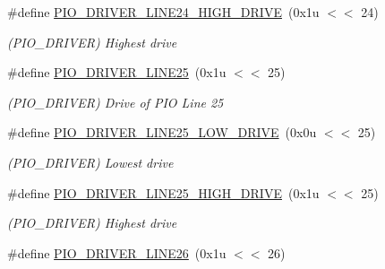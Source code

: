 \begin{DoxyCompactItemize}
\mbox{\label{group__SAMS70__PIO_gadde0770b938ec63b897a19f0f7a59d42}} 
\#define \mbox{\hyperlink{group__SAMS70__PIO_gadde0770b938ec63b897a19f0f7a59d42}{P\+I\+O\+\_\+\+D\+R\+I\+V\+E\+R\+\_\+\+L\+I\+N\+E24\+\_\+\+H\+I\+G\+H\+\_\+\+D\+R\+I\+VE}}~(0x1u $<$$<$ 24)
\begin{DoxyCompactList}\small\item\em (P\+I\+O\+\_\+\+D\+R\+I\+V\+ER) Highest drive \end{DoxyCompactList}\item 
\mbox{\label{group__SAMS70__PIO_ga7f8742c78a8a36d9daea4dd1878f0b41}} 
\#define \mbox{\hyperlink{group__SAMS70__PIO_ga7f8742c78a8a36d9daea4dd1878f0b41}{P\+I\+O\+\_\+\+D\+R\+I\+V\+E\+R\+\_\+\+L\+I\+N\+E25}}~(0x1u $<$$<$ 25)
\begin{DoxyCompactList}\small\item\em (P\+I\+O\+\_\+\+D\+R\+I\+V\+ER) Drive of P\+IO Line 25 \end{DoxyCompactList}\item 
\mbox{\label{group__SAMS70__PIO_ga96a9aaf154c0cc69aeaa3984fa003905}} 
\#define \mbox{\hyperlink{group__SAMS70__PIO_ga96a9aaf154c0cc69aeaa3984fa003905}{P\+I\+O\+\_\+\+D\+R\+I\+V\+E\+R\+\_\+\+L\+I\+N\+E25\+\_\+\+L\+O\+W\+\_\+\+D\+R\+I\+VE}}~(0x0u $<$$<$ 25)
\begin{DoxyCompactList}\small\item\em (P\+I\+O\+\_\+\+D\+R\+I\+V\+ER) Lowest drive \end{DoxyCompactList}\item 
\mbox{\label{group__SAMS70__PIO_ga739e54f9d4c19e6e722202b6828a787f}} 
\#define \mbox{\hyperlink{group__SAMS70__PIO_ga739e54f9d4c19e6e722202b6828a787f}{P\+I\+O\+\_\+\+D\+R\+I\+V\+E\+R\+\_\+\+L\+I\+N\+E25\+\_\+\+H\+I\+G\+H\+\_\+\+D\+R\+I\+VE}}~(0x1u $<$$<$ 25)
\begin{DoxyCompactList}\small\item\em (P\+I\+O\+\_\+\+D\+R\+I\+V\+ER) Highest drive \end{DoxyCompactList}\item 
\mbox{\label{group__SAMS70__PIO_ga01ca9f2e050c3c12260122e506e02a9a}} 
\#define \mbox{\hyperlink{group__SAMS70__PIO_ga01ca9f2e050c3c12260122e506e02a9a}{P\+I\+O\+\_\+\+D\+R\+I\+V\+E\+R\+\_\+\+L\+I\+N\+E26}}~(0x1u $<$$<$ 26)
$$
\end{DoxyCompactItemize}
